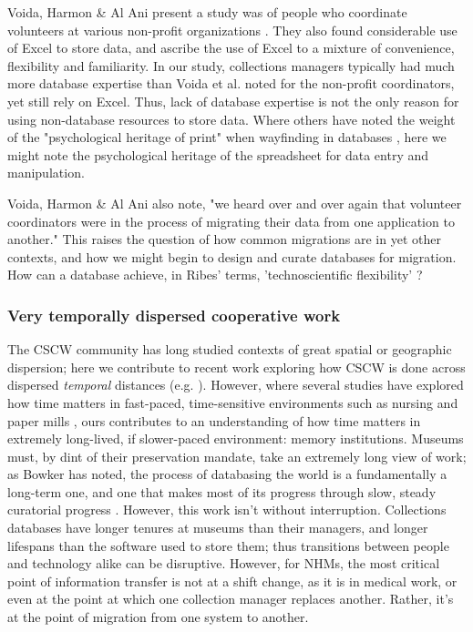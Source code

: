 Voida, Harmon & Al Ani present a study was of people who coordinate volunteers at various non-profit organizations \cite{voida2011homebrew}. They also found considerable use of Excel to store data, and ascribe the use of Excel to a mixture of convenience, flexibility and familiarity. In our study, collections managers typically had much more database expertise than Voida et al. noted for the non-profit coordinators, yet still rely on Excel. Thus, lack of database expertise is not the only reason for using non-database resources to store data. Where others have noted the weight of the "psychological heritage of print" when wayfinding in databases \cite{Kerr_1990}, here we might note the psychological heritage of the spreadsheet for data entry and manipulation.

Voida, Harmon & Al Ani also note, "we heard over and over again that volunteer coordinators were in the process of migrating their data from one application to another." This raises the question of how common migrations are in yet other contexts, and how we might begin to design and curate databases for migration. How can a database achieve, in Ribes' terms, 'technoscientific flexibility' \cite{ribes2014kernel}?

\subsubsection{Very temporally dispersed cooperative work}

The CSCW community has long studied contexts of great spatial or geographic dispersion; here we contribute to recent work exploring how CSCW is done across dispersed \textit{temporal} distances (e.g. \cite{Jackson_2011, Lindley_2015}). However, where several studies have explored how time matters in fast-paced, time-sensitive environments such as nursing \cite{sarcevic2009information, Reddy_2006} and paper mills \cite{auramaki1996paperwork}, ours contributes to an understanding of how time matters in extremely long-lived, if slower-paced environment: memory institutions. Museums must, by dint of their preservation mandate, take an extremely long view of work; as Bowker has noted, the process of databasing the world is a fundamentally a long-term one, and one that makes most of its progress through slow, steady curatorial progress \cite{Bowker_2000}. However, this work isn't without interruption. Collections databases have longer tenures at museums than their managers, and longer lifespans than the software used to store them; thus transitions between people and technology alike can be disruptive. However, for NHMs, the most critical point of information transfer is not at a shift change, as it is in medical work, or even at the point at which one collection manager replaces another. Rather, it's at the point of migration from one system to another.

